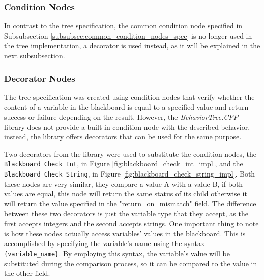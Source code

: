 \subsubsection{Condition Nodes}

In contrast to the tree specification, the common condition node specified in Subsubsection \ref{subsubsec:common_condition_nodes_spec} is no longer used in the tree implementation, a decorator is used instead, as it will be explained in the next subsubsection.

\subsubsection{Decorator Nodes}

The tree specification was created using condition nodes that verify whether the content of a variable in the blackboard is equal to a specified value and return success or failure depending on the result. However, the \textit{BehaviorTree.CPP} library does not provide a built-in condition node with the described behavior, instead, the library offers decorators that can be used for the same purpose. 

Two decorators from the library were used to substitute the condition nodes, the \texttt{Blackboard Check Int}, in Figure \ref{fig:blackboard_check_int_impl}, and the \texttt{Blackboard Check String}, in Figure \ref{fig:blackboard_check_string_impl}. Both these nodes are very similar, they compare a value A with a value B, if both values are equal, this node will return the same status of its child otherwise it will return the value specified in the "return\_on\_mismatch" field. The difference between these two decorators is just the variable type that they accept, as the first accepts integers and the second accepts strings. One important thing to note is how these nodes actually access variables' values in the blackboard. This is accomplished by specifying the variable's name using the syntax \texttt{\{variable\_name\}}. By employing this syntax, the variable's value will be substituted during the comparison process, so it can be compared to the value in the other field. 

